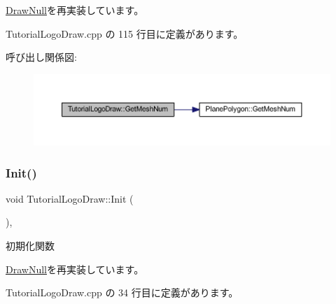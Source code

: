\mbox{\hyperlink{class_draw_null_ad735978a85a5f3583eecd82d6bfe6413}{Draw\+Null}}を再実装しています。



 Tutorial\+Logo\+Draw.\+cpp の 115 行目に定義があります。

呼び出し関係図\+:\nopagebreak
\begin{figure}[H]
\begin{center}
\leavevmode
\includegraphics[width=350pt]{class_tutorial_logo_draw_a19de254c5460e3728d7c79243fd65e6f_cgraph}
\end{center}
\end{figure}
\mbox{\label{class_tutorial_logo_draw_a53fc4b1b23c7f9e249600be67510f944}} 
\subsubsection{\texorpdfstring{Init()}{Init()}}
{\footnotesize\ttfamily void Tutorial\+Logo\+Draw\+::\+Init (\begin{DoxyParamCaption}{ }\end{DoxyParamCaption})\hspace{0.3cm}{\ttfamily [override]}, {\ttfamily [virtual]}}



初期化関数 



\mbox{\hyperlink{class_draw_null_acd7fef3ccea1da537ac9507ffbb6dd2e}{Draw\+Null}}を再実装しています。



 Tutorial\+Logo\+Draw.\+cpp の 34 行目に定義があります。

